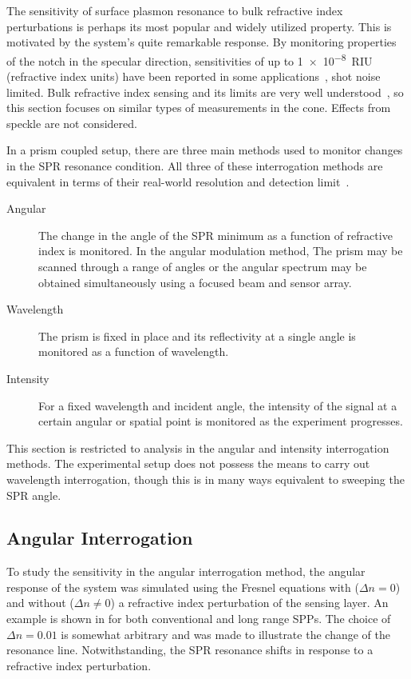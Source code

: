 The sensitivity of surface plasmon resonance to bulk refractive index
perturbations is perhaps its most popular and widely utilized property.
This is motivated by the system's quite remarkable response. By monitoring
properties of the notch in the specular direction, sensitivities of up to
\SI{1e-8}{RIU} (refractive index units) have been reported in some
applications~\cite{fan2008sensitive}, shot noise limited.  Bulk refractive
index sensing and its limits are very well
understood~\cite{piliarik2009surface}, so this section focuses on similar
types of measurements in the cone.  Effects from speckle are not considered.

In a prism coupled setup, there are three main methods used to monitor changes
in the SPR resonance condition.  All three of these interrogation methods are
equivalent in terms of their real-world resolution and detection
limit~\cite{homola2006surface}.
\begin{description}
	\item [{Angular}] The change in the angle of the SPR minimum as a function
					of refractive index is monitored.  In the angular modulation method,
					The prism may be scanned through a range of angles or the angular
					spectrum may be obtained simultaneously using a focused beam and
					sensor array.
 \item [{Wavelength}] The prism is fixed in place and its reflectivity at
  a single angle is monitored as a function of wavelength.
	\item [{Intensity}] For a fixed wavelength and incident angle, the
		intensity of the signal at a certain angular or spatial point is
		monitored as the experiment progresses.
\end{description}
This section is restricted to analysis in the angular and intensity
interrogation methods.  The experimental setup does not possess the means to
carry out wavelength interrogation, though this is in many ways equivalent to
sweeping the SPR angle. 

\subsection{Angular Interrogation}
To study the sensitivity in the angular interrogation method, the angular
response of the system was simulated using the Fresnel equations with ($\Delta
n = 0$) and without ($\Delta n \ne 0$) a refractive index perturbation of the
sensing layer.  An example is shown in  for both
conventional and long range SPPs.  The choice of $\Delta n = 0.01$ is somewhat
arbitrary and was made to illustrate the change of the resonance line.
Notwithstanding, the SPR resonance shifts in response to a refractive index
perturbation.

